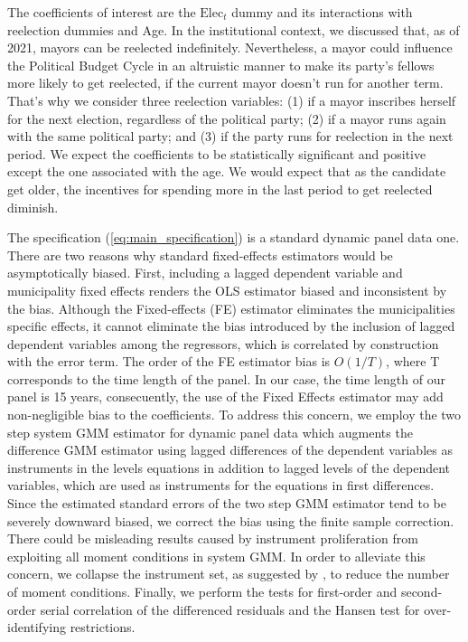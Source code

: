 The coefficients of interest are the $\text{Elec}_t$ dummy and its interactions with reelection dummies and Age. In the institutional context, we discussed that, as of 2021, mayors can be reelected indefinitely. Nevertheless, a mayor could influence the Political Budget Cycle in an altruistic manner to make its party's fellows more likely to get reelected, if the current mayor doesn't run for another term. That's why we consider three reelection variables: (1) if a mayor inscribes herself for the next election, regardless of the political party; (2) if a mayor runs again with the same political party; and (3) if the party runs for reelection in the next period. We expect the coefficients to be statistically significant and positive except the one associated with the age. We would expect that as the candidate get older, the incentives for spending more in the last period to get reelected diminish. 

The specification (\ref{eq:main_specification}) is a standard dynamic panel data one. There are two reasons why standard fixed-effects estimators would be asymptotically biased. First, including a lagged dependent variable and municipality fixed effects renders the OLS estimator biased and inconsistent by the \textcite{nickell1981} bias. Although the Fixed-effects (FE) estimator eliminates the municipalities specific effects, it cannot eliminate the bias introduced by the inclusion of lagged dependent variables among the regressors, which is correlated by construction with the error term. The order of the FE estimator bias is $O(1/T)$, where T corresponds to the time length of the panel. In our case, the time length of our panel is 15 years, consecuently, the use of the Fixed Effects estimator may add non-negligible bias to the coefficients. To address this concern, we employ the \textcite{blundell1998} two step system GMM estimator for dynamic panel data which augments the \textcite{arellano1991} difference GMM estimator using lagged differences of the dependent variables as instruments in the levels equations in addition to lagged levels of the dependent variables, which are used as instruments for the equations in first differences. Since the estimated standard errors of the two step GMM estimator tend to be severely downward biased, we correct the bias using the \textcite{windmeijer2005} finite sample correction. There could be misleading results caused by instrument proliferation from exploiting all moment conditions in system GMM. In order to alleviate this concern, we collapse the instrument set, as suggested by \textcite{roodman2009}, to reduce the number of moment conditions. Finally, we perform the \textcite{arellano1991} tests for first-order and second-order serial correlation of the differenced residuals and the Hansen test for over-identifying restrictions. 

